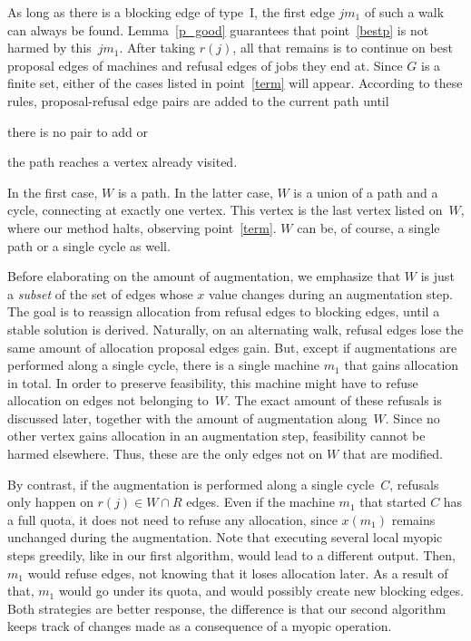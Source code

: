 \documentclass{llncs}
\begin{document}
As long as there is a blocking edge of type~I, the first edge $jm_1$ of such a walk can always be found. Lemma~\ref{p_good} guarantees that point~\ref{bestp} is not harmed by this~$jm_1$. After taking $r(j)$, all that remains is to continue on best proposal edges of machines and refusal edges of jobs they end at. Since $G$ is a finite set, either of the cases listed in point~\ref{term} will appear. According to these rules, proposal-refusal edge pairs are added to the current path until \begin{inparaenum}[1)]
	\item there is no pair to add or 
	\item the path reaches a vertex already visited. \end{inparaenum} In the first case, $W$ is a path. In the latter case, $W$ is a union of a path and a cycle, connecting at exactly one vertex. This vertex is the last vertex listed on~$W$, where our method halts, observing point~\ref{term}. $W$ can be, of course, a single path or a single cycle as well.
	


	Before elaborating on the amount of augmentation, we emphasize that $W$ is just a \emph{subset} of the set of edges whose $x$ value changes during an augmentation step. The goal is to reassign allocation from refusal edges to blocking edges, until a stable solution is derived. Naturally, on an alternating walk, refusal edges lose the same amount of allocation proposal edges gain. But, except if augmentations are performed along a single cycle, there is a single machine $m_1$ that gains allocation in total. In order to preserve feasibility, this machine might have to refuse allocation on edges not belonging to~$W$. The exact amount of these refusals is discussed later, together with the amount of augmentation along~$W$. Since no other vertex gains allocation in an augmentation step, feasibility cannot be harmed elsewhere. Thus, these are the only edges not on $W$ that are modified.
	
	 By contrast, if the augmentation is performed along a single cycle~$C$, refusals only happen on $r(j) \in W \cap R$ edges. Even if the machine $m_1$ that started $C$ has a full quota, it does not need to refuse any allocation, since $x(m_1)$ remains unchanged during the augmentation. Note that executing several local myopic steps greedily, like in our first algorithm, would lead to a different output. Then, $m_1$ would refuse edges, not knowing that it loses allocation later. As a result of that, $m_1$ would go under its quota, and would possibly create new blocking edges. Both strategies are better response, the difference is that our second algorithm keeps track of changes made as a consequence of a myopic operation.	
\end{document}
